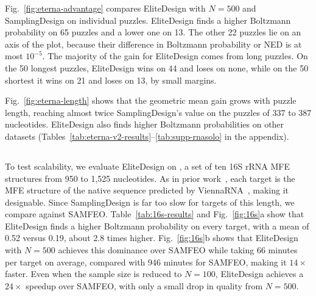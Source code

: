 Fig.~\ref{fig:eterna-advantage} compares EliteDesign with $N=500$ and SamplingDesign on individual puzzles. EliteDesign finds a higher Boltzmann probability on 65 puzzles and a lower one on 13. The other 22 puzzles lie on an axis of the plot, because their difference in Boltzmann probability or NED is at most $10^{-5}$. The majority of the gain for EliteDesign comes from long puzzles. On the 50 longest puzzles, EliteDesign wins on 44 and loses on none, while on the 50 shortest it wins on 21 and loses on 13, by small margins.

Fig.~\ref{fig:eterna-length} shows that the geometric mean gain grows with puzzle length, reaching almost twice SamplingDesign's value on the puzzles of 337 to 387 nucleotides. EliteDesign also finds higher Boltzmann probabilities on other datasets (Tables~\ref{tab:eterna-v2-results}--\ref{tab:supp-rnasolo} in the appendix).



\subsection{\sixteenS{}}\label{sec:results-16s}


To test scalability, we evaluate EliteDesign on \sixteenS{}, a set of ten 16S rRNA MFE structures from 950 to 1,525 nucleotides. As in prior work~\citep{zhou2023,zhou2026fastdesign}, each target is the MFE structure of the native sequence predicted by ViennaRNA~\citep{lorenz2011}, making it designable. Since SamplingDesign is far too slow for targets of this length, we compare against SAMFEO. Table~\ref{tab:16s-results} and Fig.~\ref{fig:16s}a show that EliteDesign finds a higher Boltzmann probability on every target, with a mean of 0.52 versus 0.19, about 2.8 times higher. Fig.~\ref{fig:16s}b shows that EliteDesign with $N=500$ achieves this dominance over SAMFEO while taking 66 minutes per target on average, compared with 946 minutes for SAMFEO, making it $14\times$ faster. Even when the sample size is reduced to $N=100$, EliteDesign achieves a $24\times$ speedup over SAMFEO, with only a small drop in quality from $N=500$.

